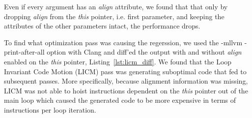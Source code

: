 Even if every argument has an \textit{align} attribute, we found that that only
by dropping \textit{align} from the \textit{this} pointer, i.e. first parameter, and
keeping the attributes of the other parameters intact, the performance drops.

To find what optimization pass was causing the regerssion, we used the -mllvm
-print-after-all option with Clang and diff'ed the output with and without
\textit{align} enabled on the \textit{this} pointer,
Listing~\ref{lst:licm_diff}. We found that the Loop Invariant Code Motion (LICM)
pass was generating suboptimal code that fed to subsequent passes. More
specifically, because alignment information was missing, LICM was not able to
hoist instructions dependent on the \textit{this} pointer out of the main loop
which caused the generated code to be more expensive in terms of instructions
per loop iteration.


